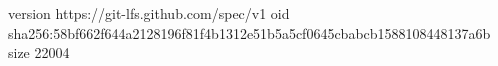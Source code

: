 version https://git-lfs.github.com/spec/v1
oid sha256:58bf662f644a2128196f81f4b1312e51b5a5cf0645cbabcb1588108448137a6b
size 22004
